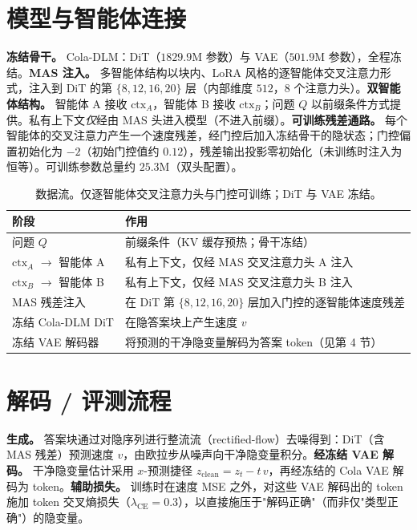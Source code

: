 \documentclass[10pt]{article}
\newcommand{\ctxa}{$\text{ctx}_A$}
\newcommand{\ctxb}{$\text{ctx}_B$}
\begin{document}
\section{模型与智能体连接}
\textbf{冻结骨干。} Cola-DLM：DiT（$1829.9$M 参数）与 VAE（$501.9$M 参数），全程冻结。\textbf{MAS 注入。} 多智能体结构以块内、LoRA 风格的逐智能体交叉注意力形式，注入到 DiT 的第 $\{8,12,16,20\}$ 层（内部维度 $512$，$8$ 个注意力头）。\textbf{双智能体结构。} 智能体 A 接收 \ctxa{}，智能体 B 接收 \ctxb{}；问题 $Q$ 以前缀条件方式提供。私有上下文\emph{仅}经由 MAS 头进入模型（不进入前缀）。\textbf{可训练残差通路。} 每个智能体的交叉注意力产生一个速度残差，经门控后加入冻结骨干的隐状态；门控偏置初始化为 $-2$（初始门控值约 $0.12$），残差输出投影零初始化（未训练时注入为恒等）。可训练参数总量约 $25.3$M（双头配置）。

\begin{table}[H]
\centering
\small
\begin{tabular}{@{}l l@{}}
\toprule
\textbf{阶段} & \textbf{作用} \\
\midrule
问题 $Q$                       & 前缀条件（KV 缓存预热；骨干冻结） \\
\ctxa{} $\rightarrow$ 智能体 A & 私有上下文，仅经 MAS 交叉注意力头 A 注入 \\
\ctxb{} $\rightarrow$ 智能体 B & 私有上下文，仅经 MAS 交叉注意力头 B 注入 \\
MAS 残差注入                   & 在 DiT 第 $\{8,12,16,20\}$ 层加入门控的逐智能体速度残差 \\
冻结 Cola-DLM DiT              & 在隐答案块上产生速度 $v$ \\
冻结 VAE 解码器                & 将预测的干净隐变量解码为答案 token（见第 4 节） \\
\bottomrule
\end{tabular}
\caption{数据流。仅逐智能体交叉注意力头与门控可训练；DiT 与 VAE 冻结。}
\end{table}

\section{解码 / 评测流程}
\textbf{生成。} 答案块通过对隐序列进行整流流（rectified-flow）去噪得到：DiT（含 MAS 残差）预测速度 $v$，由欧拉步从噪声向干净隐变量积分。\textbf{经冻结 VAE 解码。} 干净隐变量估计采用 $x$-预测捷径 $z_{\text{clean}} = z_t - t\,v$，再经冻结的 Cola VAE 解码为 token。\textbf{辅助损失。} 训练时在速度 MSE 之外，对这些 VAE 解码出的 token 施加 token 交叉熵损失（$\lambda_{\text{CE}}{=}0.3$），以直接施压于"解码正确"（而非仅"类型正确"）的隐变量。
\end{document}
